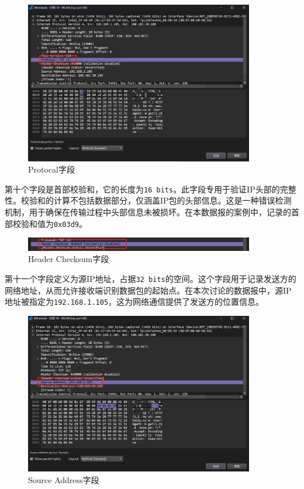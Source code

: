 \documentclass{article}
\begin{document}
	\begin{figure}[H]
		\centering
		\includegraphics[width=10cm]{images/16. Protocal字段.jpg}
		\caption{Protocal字段}
	\end{figure}
	
	第十个字段是首部校验和，它的长度为\texttt{16 bits}。此字段专用于验证IP头部的完整性。校验和的计算不包括数据部分，仅涵盖IP包的头部信息。这是一种错误检测机制，用于确保在传输过程中头部信息未被损坏。在本数据报的案例中，记录的首部校验和值为\texttt{0x03d9}。
	
	\begin{figure}[H]
		\centering
		\includegraphics[width=10cm]{images/17. Header Checksum字段.jpg}
		\caption{Header Checksum字段}
	\end{figure}
	
	第十一个字段定义为源IP地址，占据\texttt{32 bits}的空间。这个字段用于记录发送方的网络地址，从而允许接收端识别数据包的起始点。在本次讨论的数据报中，源IP地址被指定为\texttt{192.168.1.105}，这为网络通信提供了发送方的位置信息。
	
	\begin{figure}[H]
		\centering
		\includegraphics[width=10cm]{images/18. Source Address字段.jpg}
		\caption{Source Address字段}
	\end{figure}
	
\end{document}
